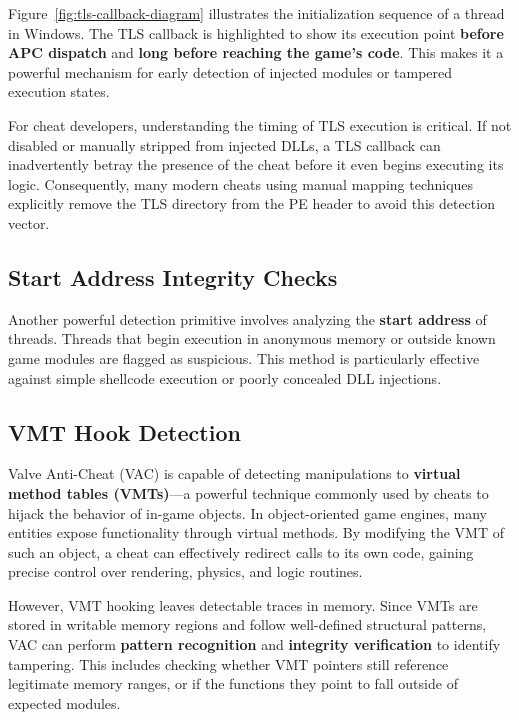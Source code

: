 Figure~\ref{fig:tls-callback-diagram} illustrates the initialization sequence of a thread in Windows. The TLS callback is highlighted to show its execution point \textbf{before APC dispatch} and \textbf{long before reaching the game’s code}. This makes it a powerful mechanism for early detection of injected modules or tampered execution states.

\vspace{1em}
For cheat developers, understanding the timing of TLS execution is critical. If not disabled or manually stripped from injected DLLs, a TLS callback can inadvertently betray the presence of the cheat before it even begins executing its logic. Consequently, many modern cheats using manual mapping techniques explicitly remove the TLS directory from the PE header to avoid this detection vector.


\subsection*{Start Address Integrity Checks}

Another powerful detection primitive involves analyzing the \textbf{start address} of threads. Threads that begin execution in anonymous memory or outside known game modules are flagged as suspicious. This method is particularly effective against simple shellcode execution or poorly concealed DLL injections.


\subsection*{VMT Hook Detection}

Valve Anti-Cheat (VAC) is capable of detecting manipulations to \textbf{virtual method tables (VMTs)}—a powerful technique commonly used by cheats to hijack the behavior of in-game objects. In object-oriented game engines, many entities expose functionality through virtual methods. By modifying the VMT of such an object, a cheat can effectively redirect calls to its own code, gaining precise control over rendering, physics, and logic routines.

However, VMT hooking leaves detectable traces in memory. Since VMTs are stored in writable memory regions and follow well-defined structural patterns, VAC can perform \textbf{pattern recognition} and \textbf{integrity verification} to identify tampering. This includes checking whether VMT pointers still reference legitimate memory ranges, or if the functions they point to fall outside of expected modules.

